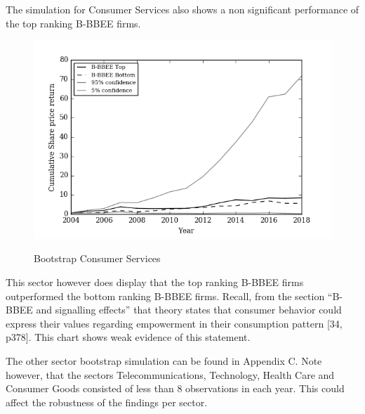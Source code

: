 The simulation for Consumer Services also shows a non significant performance of the top ranking B-BBEE firms. \begin{figure}[!h]
  \centering
  \includegraphics [scale=1]{"Images/Bootstrap_Consumer Services_Cumulative"} \\
  {\small {\it \caption{Bootstrap Consumer Services \label{fig:moun} }}}
\end{figure}
This sector however does display that the top ranking B-BBEE firms outperformed the bottom ranking B-BBEE firms. Recall, from the section “B-BBEE and signalling effects” that theory states that  consumer behavior could express their values regarding empowerment in their consumption pattern [34, p378]. This chart shows weak evidence of this statement.

The other sector bootstrap simulation can be found in Appendix C. Note however, that the sectors Telecommunications, Technology, Health Care and Consumer Goods consisted of less than 8 observations in each year. This could affect the robustness of the findings per sector. 
